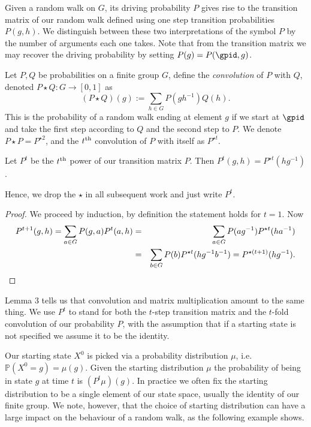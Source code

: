 \documentclass[11pt]{report}
\begin{document}
Given a random walk on $G$, its driving probability $P$ gives rise to the transition matrix of our random walk defined using one step transition probabilities $P(g,h)$. We distinguish between these two interpretations of the symbol $P$ by the number of arguments each one takes.  Note that from the transition matrix we may recover the driving probability by setting $P(g) = P(\gpid,g)$.



\begin{defn}
	\label{chpt2:def:conv}
	Let $P, Q$ be probabilities on a finite group $G$, define the \emph{convolution} 
	of $P$ with $Q$, denoted 
	$P \star Q: G \to [0,1]$ as
	\[(P \star Q)(g) :=\sum_{h\in G}P(gh^{-1})Q(h).\]
	This is the probability of a random walk ending at element $g$ if we start at $\gpid$ and take the first step according to $Q$ and the second step to $P$.
	We denote $P \star P = P^{\star 2}$, and the $t^{\textnormal{th}}$ convolution of $P$ with itself as $P^{\star t}$.
\end{defn}
\begin{lemma}
	Let $P^{t}$ be the $t^{\textnormal{th}}$ power of our transition matrix 
	$P$. Then $P^{t} (g,h)= P^{\star t}(hg^{-1})$. 
	
	Hence, we drop the 	$\star$ in all subsequent work and just write $P^{t}$.
\end{lemma}
\begin{proof}
	We proceed by induction, by definition the statement holds for $t=1$. Now 
	\begin{eqnarray*}
		P^{t+1}(g,h) =  \sum_{a\in G} 
		P(g,a)
		P^{t}(a,h) &= &\sum_{a\in G} P(ag^{-1}) P^{\star t}(ha^{-1})\\
		& = & \sum_{b\in G} P(b) P^{\star t}(h g^{-1} b^{-1}) = 
		P^{\star (t+1)}(hg^{-1}). \qedhere
	\end{eqnarray*}
\end{proof}

Lemma 3 tells us that convolution and matrix multiplication amount to the same thing. We use $P^{t}$ to stand for both the $t$-step 
transition matrix and the $t$-fold convolution of our probability $P$, with the 
assumption that if a starting state is not specified we assume it to be the 
identity.







Our starting state $X^{0}$ is picked via a 
probability distribution $\mu$, i.e. $\mathbb{P}(X^{0}=g) = \mu(g)$. Given the 
starting distribution $\mu$ the probability of being in state $g$ at time $t$ 
is $(P^{t} \mu)(g)$. In practice we often fix the starting 
distribution to be a single element of our state space, usually the identity of our finite group. We note, however, that the choice of 
starting distribution can have a large impact on the behaviour of a random walk, as the following example shows.
\end{document}
